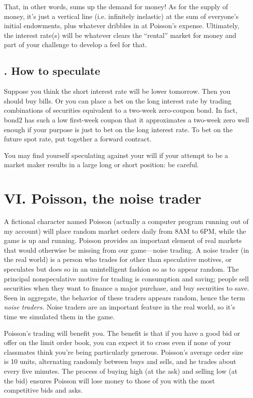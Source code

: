 That, in other words, sums up the demand for money!  As for the supply
of money, it's just a vertical line (i.e. infinitely inelastic) at the
sum of everyone's initial endowments, plus whatever dribbles in at
Poisson's expense.  Ultimately, the interest rate(s) will be whatever
clears the ``rental'' market for money and part of your challenge to
develop a feel for that.


\subsection{. How to speculate}%
Suppose you think the short interest rate will be lower tomorrow.
Then you should buy bills.  Or you can place a bet on the long
interest rate by trading combinations of securities equivalent to a
two-week zero-coupon bond.  In fact, bond2 has such a low first-week
coupon that it approximates a two-week zero well enough if your
purpose is just to bet on the long interest rate.  To bet on the
future spot rate, put together a forward contract.

You may find yourself speculating against your will if your attempt
to be a market maker results in a large long or short position: be
careful.

\section{VI. Poisson, the noise trader}%
A fictional character named Poisson (actually a computer program
running out of my account) will place random market orders daily from
8AM to 6PM, while the game is up and running.  Poisson provides an
important element of real markets that would otherwise be missing from
our game---noise trading.  A noise trader (in the real world) is a
person who trades for other than speculative motives, or speculates
but does so in an unintelligent fashion so as to appear random.  The
principal nonspeculative motive for trading is consumption and saving;
people sell securities when they want to finance a major purchase, and buy
securities to save.  Seen in aggregate, the
behavior of these traders appears random, hence the term {\it noise
traders.}  Noise traders are an important feature in the real
world, so it's time we simulated them in the game.

Poisson's trading will benefit you.  The benefit is that if you have
a good bid or offer on the limit order book, you can expect it to
cross even if none of your classmates think you're being particularly
generous.  Poisson's average order size is 10 units,%
alternating randomly between buys and sells, and he trades about
every five minutes.  The process of buying high (at the ask) and
selling low (at the bid) ensures Poisson will lose money to those of
you with the most competitive bids and asks.

